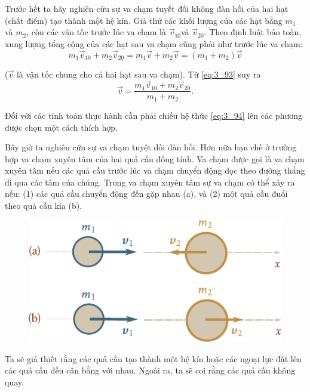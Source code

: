 Trước hết ta hãy nghiên cứu sự va chạm tuyết đối không đàn hồi của hai hạt  (chất điểm) tạo thành một hệ kín. Giả thử các khối lượng của các hạt bằng $m_1$ và $m_2$, còn các vận tốc trước lúc va chạm là $\vec{v}_{10}$và $\vec{v}_{20}$. Theo định luật bảo toàn, xung lượng tổng cộng của các hạt sau va chạm cũng phải như trước lúc va chạm:
\begin{equation}\label{eq:3_93}
m_1\vec{v}_{10} + m_2\vec{v}_{20} = m_1\vec{v} + m_2\vec{v} = (m_1+m_2) \vec{v}
\end{equation}

\noindent
($\vec{v}$ là vận tốc chung cho cả hai hạt sau va chạm). Từ \eqref{eq:3_93} suy ra
\begin{equation}\label{eq:3_94}
\vec{v} = \frac{m_1\vec{v}_{10} + m_2\vec{v}_{20}}{m_1+m_2}.
\end{equation}

\noindent
Đối với các tính toán thực hành cần phải chiếu hệ thức \eqref{eq:3_94} lên các phương được chọn một cách thích hợp.


Bây giờ ta nghiên cứu sự va chạm tuyệt đối đàn hồi. Hơn nữa hạn chế ở trường hợp va chạm xuyên tâm của hai quả cầu đồng tính. Va chạm được gọi là va chạm xuyên tâm nếu các quả cầu trước lúc va chạm chuyển động dọc theo đường thẳng đi qua các tâm của chúng. Trong va chạm xuyên tâm sự va chạm có thể xảy ra nếu:  (1) các quả cầu chuyển động đến gặp nhau  (a), và (2) một quả cầu đuổi theo quả cầu kia (b).

\begin{figure}[!htb]
	\begin{center}
		\includegraphics[scale=1]{figures/ch_03/fig_3_16.pdf}
		\caption[]{}
		\label{fig:3_16}
	\end{center}
\end{figure}

Ta sẽ giả thiết rằng các quả cầu tạo thành một hệ kín hoặc các ngoại lực đặt lên các quả cầu đều cân bằng với nhau. Ngoài ra, ta sẽ coi rằng các quả cầu không quay.

